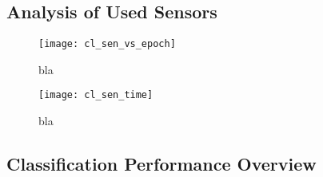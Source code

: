 \subsection{Analysis of Used Sensors} \label{ssec:final_configuration}

\begin{figure}[H]
  \centering
  \texttt{[image: cl\_sen\_vs\_epoch]}
  \caption{bla}
  \label{fig:sen_vs_epoch}
\end{figure}

\begin{figure}[H]
  \centering
  \texttt{[image: cl\_sen\_time]}
  \caption{bla}
  \label{fig:sen_time}
\end{figure}

\subsection{Classification Performance Overview} \label{ssec:results_overview}

